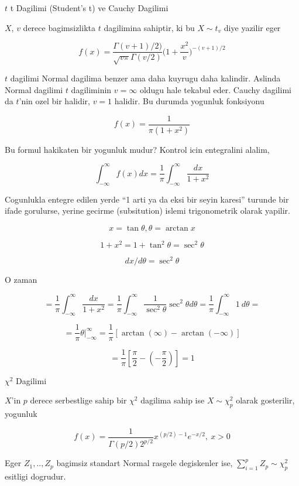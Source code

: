 \documentclass[12pt,fleqn]{article}\usepackage{../common}
\begin{document}
$t$ t Dagilimi (Student's t) ve Cauchy Dagilimi 

$X$, $v$ derece bagimsizlikta $t$ dagilimina sahiptir, ki bu $X \sim t_v$
diye yazilir eger 

$$ f(x) = 
\frac{ \Gamma(v+1)/2)} {\sqrt{v\pi}\Gamma(v/2)}
\bigg(1 + \frac{ x^2}{v}\bigg)^{-(v+1)/2}
 $$

$t$ dagilimi Normal dagilima benzer ama daha kuyrugu daha kalindir. Aslinda
Normal dagilimi $t$ dagiliminin $v = \infty$ oldugu hale tekabul
eder. Cauchy dagilimi da $t$'nin ozel bir halidir, $v = 1$ halidir. Bu
durumda yogunluk fonksiyonu

$$ f(x)  = \frac{ 1}{\pi(1+ x^2)} $$

Bu formul hakikaten bir yogunluk mudur? Kontrol icin entegralini alalim, 

$$ \int _{ -\infty}^{\infty} f(x) dx = 
\frac{ 1}{\pi} \int _{ -\infty}^{\infty} \frac{ dx}{1 + x^2} 
 $$

Cogunlukla entegre edilen yerde  ``1 arti ya da eksi bir seyin karesi''
turunde  bir ifade gorulurse, yerine gecirme (subsitution) islemi
trigonometrik  olarak  yapilir. 

$$  x = \tan \theta, \theta = \arctan x $$

$$ 1 + x^2 = 1 + \tan^2\theta = \sec^2\theta$$

$$ dx / d\theta = \sec^2\theta $$

O zaman 

$$ =
\frac{ 1}{\pi} \int _{ -\infty}^{\infty} \frac{ dx}{1 + x^2}   =
\frac{ 1}{\pi} \int _{ -\infty}^{\infty}  \frac{ 1}{\sec^2\theta}\sec^2\theta d\theta = 
\frac{ 1}{\pi} \int _{ -\infty}^{\infty}  1 \ d\theta = 
 $$

$$ = 
\frac{ 1}{\pi} \theta | _{ -\infty}^{\infty}   = 
\frac{ 1}{\pi} [\arctan(\infty) - \arctan(-\infty)]
 $$

$$ =
\frac{ 1}{\pi} [\frac{ \pi}{2} - (-\frac{ \pi}{2}) ] = 1
 $$


$\chi^2$ Dagilimi

$X$'in $p$ derece serbestlige sahip bir $\chi^2$ dagilima sahip ise $X \sim
\chi^2_p$ olarak gosterilir, yogunluk 

$$ f(x) = \frac{ 1}{\Gamma(p/2) 2^{p/2}} x^{(p/2) - 1} e^{-x/2 }, \ x > 0 $$

Eger $Z_1, .. , Z_p$ bagimsiz standart Normal rasgele degiskenler ise,
$\sum _{ i=1}^{p} Z_p \sim \chi^2_p$ esitligi dogrudur. 
\end{document}
